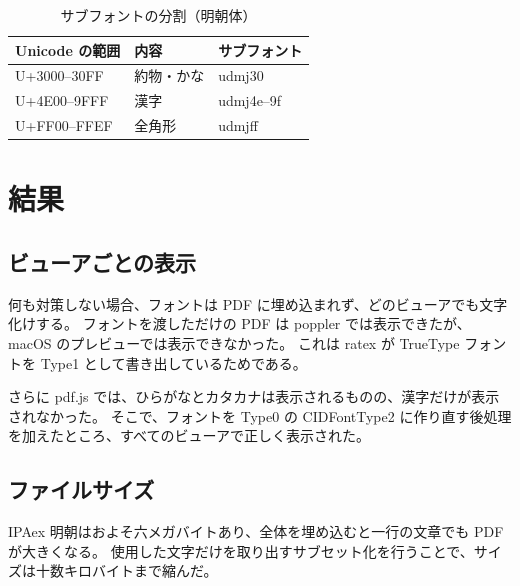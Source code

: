 \documentclass[11pt]{article}
\newcommand{\goth}[1]{#1}
\begin{document}
\begin{table}[h]
\centering
\begin{tabular}{lll}
\hline
\textbf{Unicode の範囲} & 内容 & サブフォント \\
\hline
U+3000--30FF & 約物・かな & udmj30 \\
U+4E00--9FFF & 漢字 & udmj4e--9f \\
U+FF00--FFEF & 全角形 & udmjff \\
\hline
\end{tabular}
\caption{サブフォントの分割（明朝体）}
\end{table}

\section{\goth{結果}}
\subsection{\goth{ビューアごとの表示}}
何も対策しない場合、フォントは PDF に埋め込まれず、どのビューアでも文字化けする。
フォントを渡しただけの PDF は poppler では表示できたが、macOS のプレビューでは表示できなかった。
これは ratex が TrueType フォントを Type1 として書き出しているためである。

さらに pdf.js では、ひらがなとカタカナは表示されるものの、漢字だけが表示されなかった。
そこで、フォントを Type0 の CIDFontType2 に作り直す後処理を加えたところ、すべてのビューアで正しく表示された。

\subsection{\goth{ファイルサイズ}}
IPAex 明朝はおよそ六メガバイトあり、全体を埋め込むと一行の文章でも PDF が大きくなる。
使用した文字だけを取り出すサブセット化を行うことで、サイズは十数キロバイトまで縮んだ。
\end{document}
